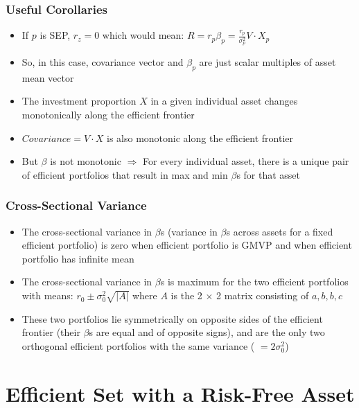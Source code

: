 \documentclass{beamer}
\begin{document}
\begin{frame}
\frametitle{Useful Corollaries}
\begin{itemize}
\item If $p$ is SEP, $r_z = 0$ which would mean: $R = r_p \beta_p = \frac {r_p} {\sigma_p^2} V \cdot X_p$
\item So, in this case, covariance vector and $\beta_p$ are just scalar multiples of asset mean vector
\item The investment proportion $X$ in a given individual asset changes monotonically along the efficient frontier
\item $Covariance = V \cdot X$ is also monotonic along the efficient frontier
\item But $\beta$ is not monotonic $\Rightarrow$ For every individual asset, there is a unique pair of efficient portfolios that result in max and min $\beta$s for that asset
\end{itemize}
\end{frame}

\begin{frame}
\frametitle{Cross-Sectional Variance}
\begin{itemize}
\item The cross-sectional variance in $\beta$s (variance in $\beta$s across assets for a fixed efficient portfolio) is zero when efficient portfolio is GMVP and when efficient portfolio has infinite mean
\item The cross-sectional variance in $\beta$s is maximum for the two efficient portfolios with means: $ r_0 \pm \sigma_0^2 \sqrt{|A|}$ where $A$ is the 2 $\times$ 2 matrix consisting of $a,b,b,c$
\item These two portfolios lie symmetrically on opposite sides of the efficient frontier (their $\beta$s are equal and of opposite signs), and are the only two orthogonal efficient portfolios with the same variance ( $= 2 \sigma_0^2$)
\end{itemize}
\end{frame}

\section{Efficient Set with a Risk-Free Asset}
\end{document}
